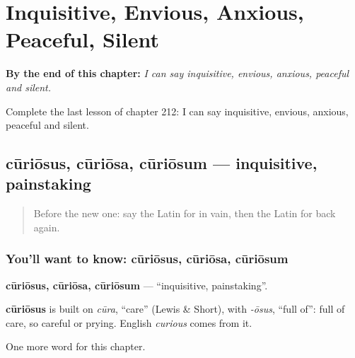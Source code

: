
\chapter{Inquisitive, Envious, Anxious, Peaceful, Silent}
\label{ch:la-inquisitive-envious-anxious-peaceful-silent}

\begin{chapteropening}
\textbf{By the end of this chapter:} \emph{I can say inquisitive, envious, anxious, peaceful and silent.}

Complete the last lesson of chapter 212: I can say inquisitive, envious, anxious, peaceful and silent.
\end{chapteropening}

\section[cūriōsus, cūriōsa, cūriōsum]{cūriōsus, cūriōsa, cūriōsum — inquisitive, painstaking}

\label{lesson:LA-C212-curiosus}



\begin{quote}
Before the new one: say the Latin for in vain, then the Latin for back again.
\end{quote}

\subsection*{You'll want to know: cūriōsus, cūriōsa, cūriōsum}
\textbf{cūriōsus, cūriōsa, cūriōsum} — \textquotedblleft{}inquisitive, painstaking\textquotedblright{}.

\begin{cousinweb}
\textbf{cūriōsus} is built on \emph{cūra}, \textquotedblleft{}care\textquotedblright{} (Lewis \& Short), with \emph{-ōsus}, \textquotedblleft{}full of\textquotedblright{}: full of care, so careful or prying. English \emph{curious} comes from it.
\end{cousinweb}

\begin{grammarlens}[title={What you've built}]
One more word for this chapter.
\end{grammarlens}

